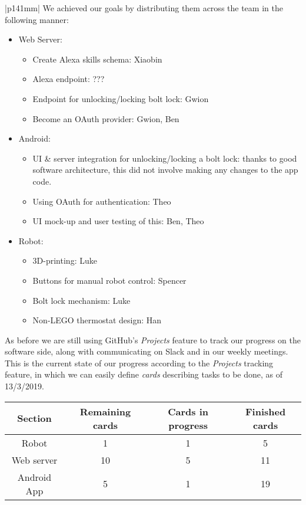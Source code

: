 \documentclass[a4paper]{article}
\newcommand{\colWidth}{141mm}
\begin{document}
\begin{center}
\begin{tabular}{|p{\colWidth}|}
		We achieved our goals by distributing them across the team in the following manner:
		\begin{itemize}
			\item Web Server:
				\begin{itemize}
					\item Create Alexa skills schema: Xiaobin
					\item Alexa endpoint: {\color{red} ???}
					\item Endpoint for unlocking/locking bolt lock: Gwion
					\item Become an OAuth provider: Gwion, Ben
				\end{itemize}
			\item Android:
				\begin{itemize}
					\item UI \& server integration for unlocking/locking a bolt lock: thanks to good software architecture, this did not involve making any changes to the app code.
					\item Using OAuth for authentication: Theo
					\item UI mock-up and user testing of this: Ben, Theo
				\end{itemize}
			\item Robot:
			\begin{itemize}
				\item 3D-printing: Luke
				\item Buttons for manual robot control: Spencer
				\item Bolt lock mechanism: Luke
				\item Non-LEGO thermostat design: Han
			\end{itemize}
		\end{itemize}

		As before we are still using GitHub's \textit{Projects} feature to track our progress on the software side, along with communicating on Slack and in our weekly meetings.
		This is the current state of our progress according to the \textit{Projects} tracking feature, in which
		we can easily define \textit{cards} describing tasks to be done, as of 13/3/2019.
		
		\vspace{3mm}
		
		\begin{tabular}{| c || c | c | c |} \hline
			\textbf{Section} & \textbf{Remaining cards} & \textbf{Cards in progress} & \textbf{Finished cards}\\ \hline
			Robot & 1 & 1 & 5 \\
			Web server & 10 & 5 & 11 \\
			Android App & 5 & 1 & 19 \\ \hline
		\end{tabular}


\end{tabular}
\end{center}
\end{document}
